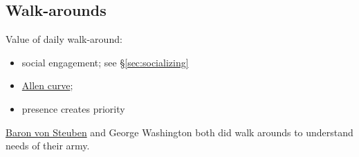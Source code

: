 \subsection{Walk-arounds}

Value of daily walk-around: 
\begin{itemize}
    \item social engagement; see \S\ref{sec:socializing}
\item \href{https://en.wikipedia.org/wiki/Allen_curve}{Allen curve}; 
\item presence creates priority
\end{itemize}

\href{https://en.wikipedia.org/wiki/Friedrich_Wilhelm_von_Steuben}{Baron von Steuben} and George Washington both did walk arounds to understand needs of their army. 